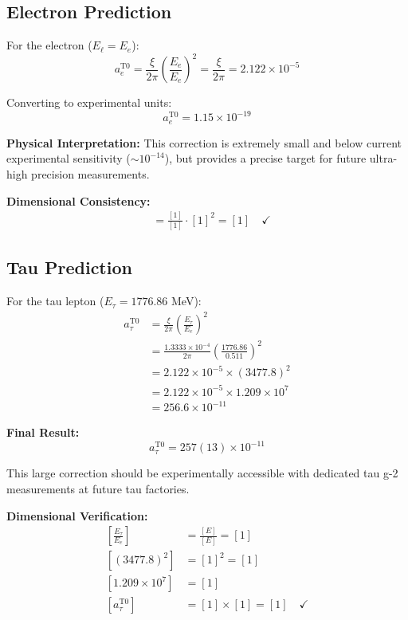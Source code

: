 \documentclass[12pt,a4paper]{report}
\begin{document}
\subsection{Electron Prediction}
\label{subsec:electron_prediction}

For the electron ($E_\ell = E_e$):
\begin{equation}
	a_e^{\text{T0}} = \frac{\xi}{2\pi} \left(\frac{E_e}{E_e}\right)^2 = \frac{\xi}{2\pi} = 2.122 \times 10^{-5}
\end{equation}

Converting to experimental units:
\begin{equation}
	a_e^{\text{T0}} = 1.15 \times 10^{-19}
\end{equation}

\textbf{Physical Interpretation:}
This correction is extremely small and below current experimental sensitivity ($\sim 10^{-14}$), but provides a precise target for future ultra-high precision measurements.

\textbf{Dimensional Consistency:}
\begin{align}
	[a_e^{\text{T0}}] &= \frac{[1]}{[1]} \cdot [1]^2 = [1] \quad \checkmark
\end{align}

\subsection{Tau Prediction}
\label{subsec:tau_prediction}

For the tau lepton ($E_\tau = 1776.86$ MeV):
\begin{align}
	a_\tau^{\text{T0}} &= \frac{\xi}{2\pi} \left(\frac{E_\tau}{E_e}\right)^2 \\
	&= \frac{1.3333 \times 10^{-4}}{2\pi} \left(\frac{1776.86}{0.511}\right)^2 \\
	&= 2.122 \times 10^{-5} \times (3477.8)^2 \\
	&= 2.122 \times 10^{-5} \times 1.209 \times 10^7 \\
	&= 256.6 \times 10^{-11}
\end{align}

\textbf{Final Result:}
\begin{equation}
	\boxed{a_\tau^{\text{T0}} = 257(13) \times 10^{-11}}
\end{equation}

This large correction should be experimentally accessible with dedicated tau g-2 measurements at future tau factories.

\textbf{Dimensional Verification:}
\begin{align}
	\left[\frac{E_\tau}{E_e}\right] &= \frac{[E]}{[E]} = [1] \\
	[(3477.8)^2] &= [1]^2 = [1] \\
	[1.209 \times 10^7] &= [1] \\
	[a_\tau^{\text{T0}}] &= [1] \times [1] = [1] \quad \checkmark
\end{align}
\end{document}
